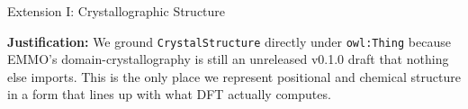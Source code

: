 \documentclass[aspectratio=169, 11pt]{beamer}
\begin{document}
\begin{frame}{Extension I: Crystallographic Structure}
{}

\vspace{0.05cm}
{\scriptsize \textbf{Justification:} We ground \texttt{CrystalStructure} directly under \texttt{owl:Thing} because EMMO's domain-crystallography is still an unreleased v0.1.0 draft that nothing else imports. This is the only place we represent positional and chemical structure in a form that lines up with what DFT actually computes.}
\end{frame}
\end{document}
